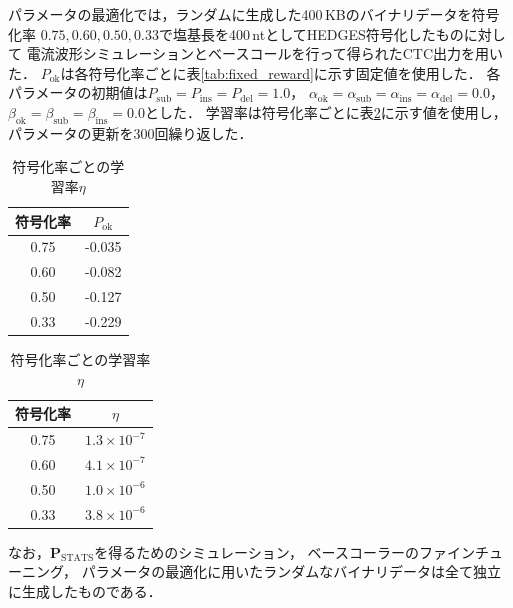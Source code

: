 \documentclass[sotsuron]{kuee}
\begin{document}
パラメータの最適化では，ランダムに生成した400\,KBのバイナリデータを符号化率
$0.75,0.60,0.50,0.33$で塩基長を400\,ntとしてHEDGES符号化したものに対して
電流波形シミュレーションとベースコールを行って得られたCTC出力を用いた．
$P_{\mathrm{ok}}$は各符号化率ごとに表\ref{tab:fixed_reward}に示す固定値を使用した．
各パラメータの初期値は$P_{\mathrm{sub}}=P_{\mathrm{ins}}=P_{\mathrm{del}}=1.0$，
$\alpha_{\mathrm{ok}}=\alpha_{\mathrm{sub}}=\alpha_{\mathrm{ins}}=\alpha_{\mathrm{del}}=0.0$，
$\beta_{\mathrm{ok}}=\beta_{\mathrm{sub}}=\beta_{\mathrm{ins}}=0.0$とした．
学習率は符号化率ごとに表\ref{tab:learning_rate}に示す値を使用し，パラメータの更新を300回繰り返した．
\begin{table}
  \centering
  \begin{minipage}{0.48\linewidth}
    \centering
    \caption{符号化率ごとの報酬値$P_{\mathrm{ok}}$}
    \label{tab:fixed_reward}
    \begin{tabular}{c|c}
      \hline
      符号化率 & $P_{\mathrm{ok}}$ \\
      \hline
      0.75 & -0.035 \\
      0.60 & -0.082 \\
      0.50 & -0.127 \\
      0.33 & -0.229 \\
      \hline
    \end{tabular}
  \end{minipage}
  \hfill
  \begin{minipage}{0.48\linewidth}
    \centering
    \caption{符号化率ごとの学習率$\eta$}
    \label{tab:learning_rate}
    \begin{tabular}{c|c}
      \hline
      符号化率 & $\eta$ \\
      \hline
      0.75 & $1.3 \times 10^{-7}$ \\
      0.60 &  $4.1 \times 10^{-7}$\\
      0.50 &  $1.0 \times 10^{-6}$ \\
      0.33 &  $3.8 \times 10^{-6}$ \\
      \hline
    \end{tabular}
  \end{minipage}
\end{table}
なお，$\bm{P}_{\mathrm{STATS}}$を得るためのシミュレーション，
ベースコーラーのファインチューニング，
パラメータの最適化に用いたランダムなバイナリデータは全て独立に生成したものである．
\end{document}

